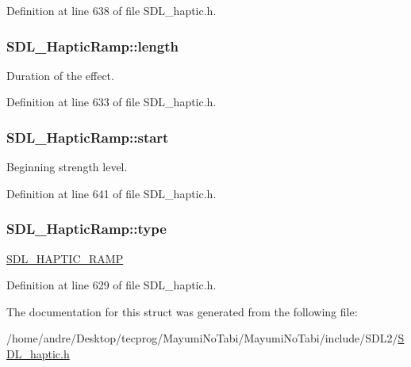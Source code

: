 Definition at line 638 of file S\-D\-L\-\_\-haptic.\-h.

\hypertarget{struct_s_d_l___haptic_ramp_a57e75237507701405af2a3caf34cdb5a}{
\subsubsection[{length}]{ S\-D\-L\-\_\-\-Haptic\-Ramp\-::length}}\label{struct_s_d_l___haptic_ramp_a57e75237507701405af2a3caf34cdb5a}
Duration of the effect. 

Definition at line 633 of file S\-D\-L\-\_\-haptic.\-h.

\hypertarget{struct_s_d_l___haptic_ramp_acc0e813ac6399290fd4a788d2471e8d4}{
\subsubsection[{start}]{ S\-D\-L\-\_\-\-Haptic\-Ramp\-::start}}\label{struct_s_d_l___haptic_ramp_acc0e813ac6399290fd4a788d2471e8d4}
Beginning strength level. 

Definition at line 641 of file S\-D\-L\-\_\-haptic.\-h.

\hypertarget{struct_s_d_l___haptic_ramp_aca1c2349372433822ab62f60976640aa}{
\subsubsection[{type}]{ S\-D\-L\-\_\-\-Haptic\-Ramp\-::type}}\label{struct_s_d_l___haptic_ramp_aca1c2349372433822ab62f60976640aa}
\hyperlink{_s_d_l__haptic_8h_af10eb937a64a8f602e9c46682ac0d868}{S\-D\-L\-\_\-\-H\-A\-P\-T\-I\-C\-\_\-\-R\-A\-M\-P} 

Definition at line 629 of file S\-D\-L\-\_\-haptic.\-h.



The documentation for this struct was generated from the following file\-:\begin{DoxyCompactItemize}
\item 
/home/andre/\-Desktop/tecprog/\-Mayumi\-No\-Tabi/\-Mayumi\-No\-Tabi/include/\-S\-D\-L2/\hyperlink{_s_d_l__haptic_8h}{S\-D\-L\-\_\-haptic.\-h}\end{DoxyCompactItemize}

